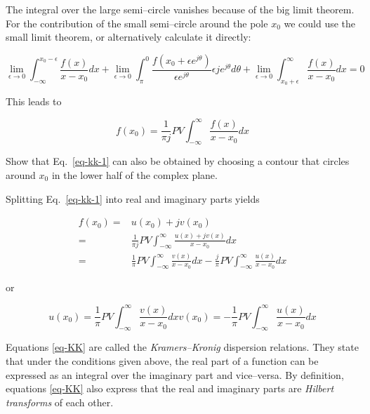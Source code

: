 The integral over the large semi--circle vanishes because of the big limit
theorem. For the contribution of the small semi--circle around the pole $x_0$ we
could use the small limit theorem, or alternatively calculate it directly:

\begin{equation}
\lim_{\epsilon \to 0} \int_{- \infty}^{x_0-\epsilon} \frac{f(x)}{x-x_0}dx +
\lim_{\epsilon \to 0} \int_{\pi}^0 \frac{f(x_0+\epsilon e^{j \theta})}{\epsilon
e^{j\theta}} \epsilon j e^{j \theta} d \theta + \lim_{\epsilon \to 0}
\int_{x_0+\epsilon}^{\infty} \frac{f(x)}{x-x_0}dx = 0
\end{equation} 

This leads to 

\begin{equation}
f(x_0) = \frac{1}{\pi j} PV \int_{- \infty}^{\infty} \frac{f(x)}{x-x_0}dx
\label{eq-kk-1}
\end{equation} 


\begin{exer}
Show that Eq.~\ref{eq-kk-1} can also be obtained by choosing a contour that circles around $x_0$ in the lower half of the complex plane.
\end{exer}

Splitting Eq.~\ref{eq-kk-1} into real and imaginary parts yields

\begin{align}
f(x_0) =& u(x_0) + jv(x_0) \nonumber \\
       =& \frac{1}{\pi j} PV \int_{- \infty}^{\infty} \frac{u(x)+jv(x)}{x-x_0}dx
 \nonumber \\
       =& \frac{1}{\pi} PV \int_{- \infty}^{\infty} \frac{v(x)}{x-x_0}dx -
\frac{j}{\pi} PV \int_{- \infty}^{\infty} \frac{u(x)}{x-x_0}dx
\end{align}

or

\begin{subequations} 
\begin{equation}
u(x_0) = \frac{1}{\pi} PV \int_{- \infty}^{\infty} \frac{v(x)}{x-x_0}dx
\end{equation} 
\begin{equation}
v(x_0) = -\frac{1}{\pi} PV \int_{- \infty}^{\infty} \frac{u(x)}{x-x_0}dx
\end{equation}
\label{eq-KK}
\end{subequations}

Equations \ref{eq-KK} are called the \emph{Kramers--Kronig} dispersion
relations. They state that under the conditions given above, the real part of a
function can be expressed as an integral over the imaginary part and
vice--versa. By definition, equations \ref{eq-KK} also express that the real and
imaginary parts are \emph{Hilbert transforms} of each other.

